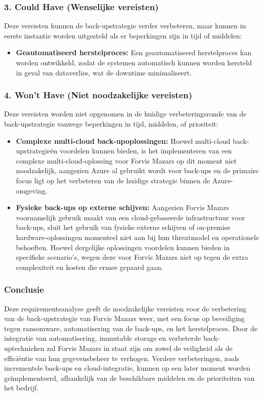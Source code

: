 \subsubsection{3. Could Have (Wenselijke vereisten)}
Deze vereisten kunnen de back-upstrategie verder verbeteren, maar kunnen in eerste instantie worden uitgesteld als er beperkingen zijn in tijd of middelen:

\begin{itemize}
    \item \textbf{Geautomatiseerd herstelproces:} Een geautomatiseerd herstelproces kan worden ontwikkeld, zodat de systemen automatisch kunnen worden hersteld in geval van dataverlies, wat de downtime minimaliseert.
\end{itemize}

\subsubsection{4. Won't Have (Niet noodzakelijke vereisten)}
Deze vereisten worden niet opgenomen in de huidige verbeteringsronde van de back-upstrategie vanwege beperkingen in tijd, middelen, of prioriteit:

\begin{itemize}
    \item \textbf{Complexe multi-cloud back-upoplossingen:} Hoewel multi-cloud back-upstrategieën voordelen kunnen bieden, is het implementeren van een complexe multi-cloud-oplossing voor Forvis Mazars op dit moment niet noodzakelijk, aangezien Azure al gebruikt wordt voor back-ups en de primaire focus ligt op het verbeteren van de huidige strategie binnen de Azure-omgeving.
    
    \item \textbf{Fysieke back-ups op externe schijven:} Aangezien Forvis Mazars voornamelijk gebruik maakt van een cloud-gebaseerde infrastructuur voor back-ups, sluit het gebruik van fysieke externe schijven of on-premise hardware-oplossingen momenteel niet aan bij hun threatmodel en operationele behoeften. Hoewel dergelijke oplossingen voordelen kunnen bieden in specifieke scenario's, wegen deze voor Forvis Mazars niet op tegen de extra complexiteit en kosten die ermee gepaard gaan.
\end{itemize}

\subsubsection{Conclusie}
Deze requirementsanalyse geeft de noodzakelijke vereisten voor de verbetering van de back-upstrategie van Forvis Mazars weer, met een focus op beveiliging tegen ransomware, automatisering van de back-ups, en het herstelproces. Door de integratie van automatisering, immutable storage en verbeterde back-uptechnieken zal Forvis Mazars in staat zijn om zowel de veiligheid als de efficiëntie van hun gegevensbeheer te verhogen. Verdere verbeteringen, zoals incrementele back-ups en cloud-integratie, kunnen op een later moment worden geïmplementeerd, afhankelijk van de beschikbare middelen en de prioriteiten van het bedrijf.

